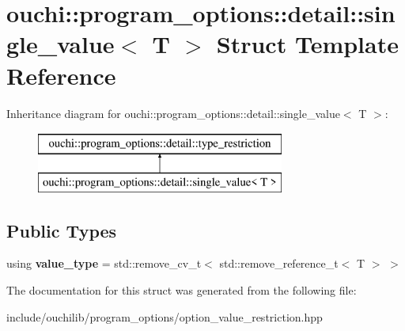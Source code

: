 \hypertarget{structouchi_1_1program__options_1_1detail_1_1single__value}{}\section{ouchi\+::program\+\_\+options\+::detail\+::single\+\_\+value$<$ T $>$ Struct Template Reference}
\label{structouchi_1_1program__options_1_1detail_1_1single__value}
Inheritance diagram for ouchi\+::program\+\_\+options\+::detail\+::single\+\_\+value$<$ T $>$\+:\begin{figure}[H]
\begin{center}
\leavevmode
\includegraphics[height=2.000000cm]{structouchi_1_1program__options_1_1detail_1_1single__value}
\end{center}
\end{figure}
\subsection*{Public Types}
\begin{DoxyCompactItemize}
\item 
\mbox{\label{structouchi_1_1program__options_1_1detail_1_1single__value_a3b26b4d652144af4866eb5d2db433e8f}} 
using {\bfseries value\+\_\+type} = std\+::remove\+\_\+cv\+\_\+t$<$ std\+::remove\+\_\+reference\+\_\+t$<$ T $>$ $>$
\end{DoxyCompactItemize}


The documentation for this struct was generated from the following file\+:\begin{DoxyCompactItemize}
\item 
include/ouchilib/program\+\_\+options/option\+\_\+value\+\_\+restriction.\+hpp\end{DoxyCompactItemize}
